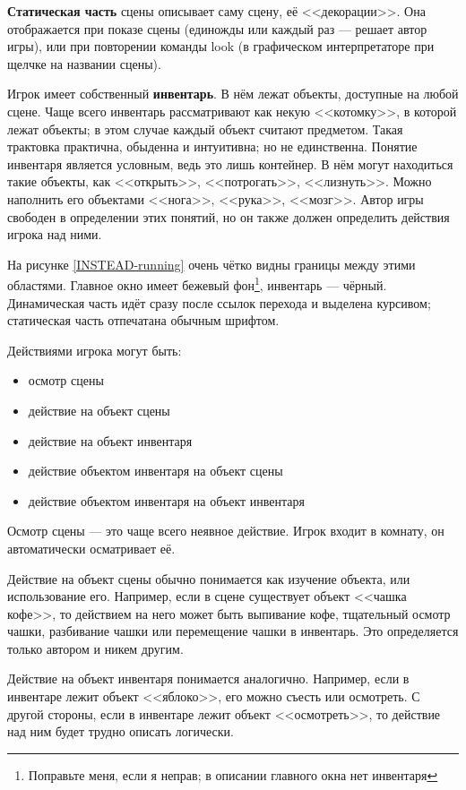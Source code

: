 \documentclass[a4paper,12pt]{article}
\begin{document}
\textbf{Статическая часть} сцены описывает саму сцену, её <<декорации>>. Она отображается при показе сцены (единожды или каждый раз --- решает автор игры), или при повторении команды look (в графическом интерпретаторе при щелчке на названии сцены).

Игрок имеет собственный \textbf{инвентарь}. В нём лежат объекты, доступные на любой сцене. Чаще всего инвентарь рассматривают как некую <<котомку>>, в которой лежат объекты; в этом случае каждый объект считают предметом. Такая трактовка практична, обыденна и интуитивна; но не единственна. Понятие инвентаря является условным, ведь это лишь контейнер. В нём могут находиться такие объекты, как <<открыть>>, <<потрогать>>, <<лизнуть>>. Можно наполнить его объектами <<нога>>, <<рука>>, <<мозг>>. Автор игры свободен в определении этих понятий, но он также должен определить действия игрока над ними.

На рисунке \ref{INSTEAD-running} очень чётко видны границы между этими областями. Главное окно имеет бежевый фон\footnote{Поправьте меня, если я неправ; в описании главного окна нет инвентаря}, инвентарь --- чёрный. Динамическая часть идёт сразу после ссылок перехода и выделена курсивом; статическая часть отпечатана обычным шрифтом.

Действиями игрока могут быть:

\begin{itemize}
\item {осмотр сцены}
\item {действие на объект сцены}
\item {действие на объект инвентаря}
\item {действие объектом инвентаря на объект сцены}
\item {действие объектом инвентаря на объект инвентаря}
\end{itemize}

Осмотр сцены --- это чаще всего неявное действие. Игрок входит в комнату, он автоматически осматривает её.

Действие на объект сцены обычно понимается как изучение объекта, или использование его. Например, если в сцене существует объект <<чашка кофе>>, то действием на него может быть выпивание кофе, тщательный осмотр чашки, разбивание чашки или перемещение чашки в инвентарь. Это определяется только автором и никем другим.

Действие на объект инвентаря понимается аналогично. Например, если в инвентаре лежит объект <<яблоко>>, его можно съесть или осмотреть. С другой стороны, если в инвентаре лежит объект <<осмотреть>>, то действие над ним будет трудно описать логически.
\end{document}
